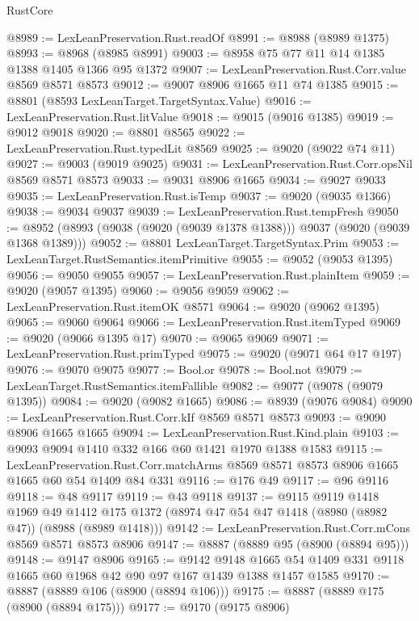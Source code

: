 \begin{lexlean}{RustCore}
\begin{coremodule}
@8989 := LexLeanPreservation.Rust.readOf
@8991 := @8988 (@8989 @1375)
@8993 := @8968 (@8985 @8991)
@9003 := @8958 @75 @77 @11 @14 @1385 @1388 @1405 @1366 @95 @1372
@9007 := LexLeanPreservation.Rust.Corr.value @8569 @8571 @8573
@9012 := @9007 @8906 @1665 @11 @74 @1385
@9015 := @8801 (@8593 LexLeanTarget.TargetSyntax.Value)
@9016 := LexLeanPreservation.Rust.litValue
@9018 := @9015 (@9016 @1385)
@9019 := @9012 @9018
@9020 := @8801 @8565
@9022 := LexLeanPreservation.Rust.typedLit @8569
@9025 := @9020 (@9022 @74 @11)
@9027 := @9003 (@9019 @9025)
@9031 := LexLeanPreservation.Rust.Corr.opsNil @8569 @8571 @8573
@9033 := @9031 @8906 @1665
@9034 := @9027 @9033
@9035 := LexLeanPreservation.Rust.isTemp
@9037 := @9020 (@9035 @1366)
@9038 := @9034 @9037
@9039 := LexLeanPreservation.Rust.tempFresh
@9050 := @8952 (@8993 (@9038 (@9020 (@9039 @1378 @1388))) @9037 (@9020 (@9039 @1368 @1389)))
@9052 := @8801 LexLeanTarget.TargetSyntax.Prim
@9053 := LexLeanTarget.RustSemantics.itemPrimitive
@9055 := @9052 (@9053 @1395)
@9056 := @9050 @9055
@9057 := LexLeanPreservation.Rust.plainItem
@9059 := @9020 (@9057 @1395)
@9060 := @9056 @9059
@9062 := LexLeanPreservation.Rust.itemOK @8571
@9064 := @9020 (@9062 @1395)
@9065 := @9060 @9064
@9066 := LexLeanPreservation.Rust.itemTyped
@9069 := @9020 (@9066 @1395 @17)
@9070 := @9065 @9069
@9071 := LexLeanPreservation.Rust.primTyped
@9075 := @9020 (@9071 @64 @17 @197)
@9076 := @9070 @9075
@9077 := Bool.or
@9078 := Bool.not
@9079 := LexLeanTarget.RustSemantics.itemFallible
@9082 := @9077 (@9078 (@9079 @1395))
@9084 := @9020 (@9082 @1665)
@9086 := @8939 (@9076 @9084)
@9090 := LexLeanPreservation.Rust.Corr.kIf @8569 @8571 @8573
@9093 := @9090 @8906 @1665 @1665
@9094 := LexLeanPreservation.Rust.Kind.plain
@9103 := @9093 @9094 @1410 @332 @166 @60 @1421 @1970 @1388 @1583
@9115 := LexLeanPreservation.Rust.Corr.matchArms
    @8569
    @8571
    @8573
    @8906
    @1665
    @1665
    @60
    @54
    @1409
    @84
    @331
@9116 := @176 @49
@9117 := @96 @9116
@9118 := @48 @9117
@9119 := @43 @9118
@9137 := @9115
    @9119
    @1418
    @1969
    @49
    @1412
    @175
    @1372
    (@8974 @47 @54 @47 @1418 (@8980 (@8982 @47)) (@8988 (@8989 @1418)))
@9142 := LexLeanPreservation.Rust.Corr.mCons @8569 @8571 @8573 @8906
@9147 := @8887 (@8889 @95 (@8900 (@8894 @95)))
@9148 := @9147 @8906
@9165 := @9142
    @9148
    @1665
    @54
    @1409
    @331
    @9118
    @1665
    @60
    @1968
    @42
    @90
    @97
    @167
    @1439
    @1388
    @1457
    @1585
@9170 := @8887 (@8889 @106 (@8900 (@8894 @106)))
@9175 := @8887 (@8889 @175 (@8900 (@8894 @175)))
@9177 := @9170 (@9175 @8906)

\end{coremodule}
\end{lexlean}
